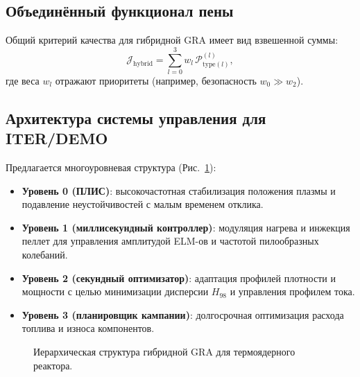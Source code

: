 \documentclass[12pt,a4paper]{article}
\numberwithin{equation}{section}
\begin{document}
\subsection{Объединённый функционал пены}
Общий критерий качества для гибридной GRA имеет вид взвешенной суммы:
\begin{equation}
\mathcal{J}_{\text{hybrid}} = \sum_{l=0}^{3} w_l \, \mathcal{P}_{\text{type}(l)}^{(l)},
\label{eq:Jhybrid}
\end{equation}
где веса $w_l$ отражают приоритеты (например, безопасность $w_0 \gg w_2$).

\subsection{Архитектура системы управления для ITER/DEMO}
Предлагается многоуровневая структура (Рис.~\ref{fig:architecture}):
\begin{itemize}
    \item \textbf{Уровень 0 (ПЛИС)}: высокочастотная стабилизация положения плазмы и подавление неустойчивостей с малым временем отклика.
    \item \textbf{Уровень 1 (миллисекундный контроллер)}: модуляция нагрева и инжекция пеллет для управления амплитудой ELM-ов и частотой пилообразных колебаний.
    \item \textbf{Уровень 2 (секундный оптимизатор)}: адаптация профилей плотности и мощности с целью минимизации дисперсии $H_{98}$ и управления профилем тока.
    \item \textbf{Уровень 3 (планировщик кампании)}: долгосрочная оптимизация расхода топлива и износа компонентов.
\end{itemize}

\begin{figure}[H]
\centering
{}
\caption{Иерархическая структура гибридной GRA для термоядерного реактора.}
\label{fig:architecture}
\end{figure}
\end{document}

